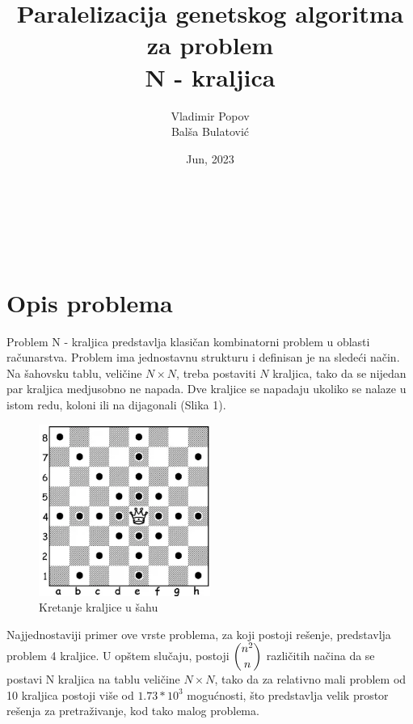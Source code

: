 \documentclass[12pt, a4paper]{article}
\title{Paralelizacija genetskog algoritma za problem\\N - kraljica}
\author{Vladimir Popov\\Balša Bulatović}
\date{Jun, 2023}
\begin{document}
	
	\maketitle
	\thispagestyle{empty}
	\newpage
	\
	\thispagestyle{empty}
	\newpage
	
	\renewcommand{\contentsname}{Sadržaj}
	\tableofcontents
	\thispagestyle{empty}
	\cleardoublepage
	\newpage
	\
	\thispagestyle{empty}
	\newpage
	
	\setcounter{page}{1}
	
	\section{Opis problema}
	Problem N - kraljica predstavlja klasičan kombinatorni problem u oblasti računa\-rstva. Problem ima jednostavnu strukturu i definisan je na sledeći način. Na šahovsku tablu, veličine $N \times N$, treba postaviti $N$ kraljica, tako da se nijedan par kraljica medjusobno ne napada. Dve kraljice se napadaju ukoliko se nalaze u istom redu, koloni ili na dijagonali (Slika 1).
	
	\begin{figure}[!htb]
		\begin{center}
			\includegraphics[width=0.5\textwidth]{images/queen-moves.png}
			\caption{Kretanje kraljice u šahu}
		\end{center}
	\end{figure}
	
	Najjednostaviji primer ove vrste problema, za koji postoji rešenje, predstavlja problem 4 kraljice. U opštem slučaju, postoji $\dbinom{n^2}{n}$ različitih načina da se postavi N kraljica na tablu veličine $N \times N$, tako da za relativno mali problem od 10 kraljica postoji više od $1.73 * 10^3$ mogućnosti, što predstavlja velik prostor rešenja za pretraživanje, kod tako malog problema.
	
\end{document}
